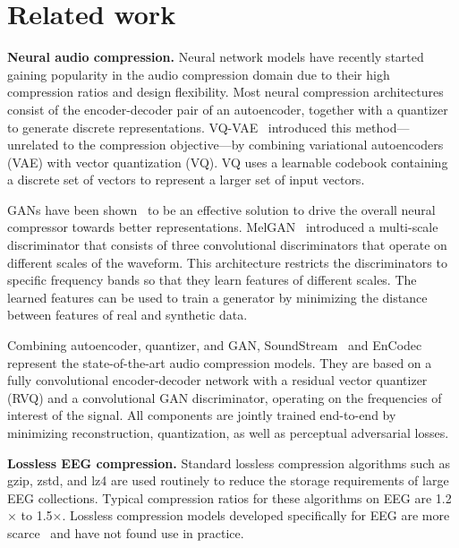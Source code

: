 \section{Related work}
\textbf{Neural audio compression.} 
Neural network models have recently started gaining popularity in the audio compression domain due to their high compression ratios and design flexibility. Most neural compression architectures consist of the encoder-decoder pair of an autoencoder, together with a quantizer to generate discrete representations. VQ-VAE~\citep{VanDenOord2017} introduced this method---unrelated to the compression objective---by combining variational autoencoders (VAE) with vector quantization (VQ). VQ uses a learnable codebook containing a discrete set of vectors to represent a larger set of input vectors.

GANs have been shown~\citep{Kumar2019, Yamamoto2020, Kong2020} to be an effective solution to drive the overall neural compressor towards better representations. MelGAN~\citep{Kumar2019} introduced a multi-scale discriminator that consists of three convolutional discriminators that operate on different scales of the waveform. This architecture restricts the discriminators to specific frequency bands so that they learn features of different scales. The learned features can be used to train a generator by minimizing the distance between features of real and synthetic data.

Combining autoencoder, quantizer, and GAN, SoundStream~\citep{Zeghidour2022} and EnCodec~\citep{Defossez2023} represent the state-of-the-art audio compression models. They are based on a fully convolutional encoder-decoder network with a residual vector quantizer (RVQ) and a convolutional GAN discriminator, operating on the frequencies of interest of the signal. All components are jointly trained end-to-end by minimizing reconstruction, quantization, as well as perceptual adversarial losses. 

\textbf{Lossless EEG compression.} Standard lossless compression algorithms such as gzip, zstd, and lz4 are used routinely to reduce the storage requirements of large EEG collections. Typical compression ratios for these algorithms on EEG are 1.2$\times$ to 1.5$\times$. Lossless compression models developed specifically for EEG are more scarce~\citep{Alsenwi2018, Hadi2021, AlNassrawy2022} and have not found use in practice.

